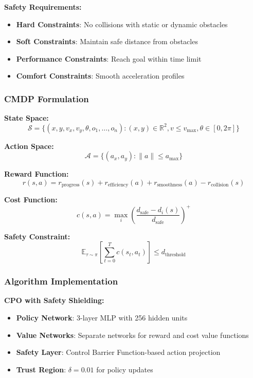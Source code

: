 \documentclass[12pt]{article}
\begin{document}
{{{{\textbf{Safety Requirements:}
\begin{itemize}
\item \textbf{Hard Constraints}: No collisions with static or dynamic obstacles
\item \textbf{Soft Constraints}: Maintain safe distance from obstacles
\item \textbf{Performance Constraints}: Reach goal within time limit
\item \textbf{Comfort Constraints}: Smooth acceleration profiles
\end{itemize}

\subsubsection{CMDP Formulation}

\textbf{State Space:}
\begin{equation}
\mathcal{S} = \{(x, y, v_x, v_y, \theta, o_1, \ldots, o_n) : (x, y) \in \mathbb{R}^2, v \leq v_{\max}, \theta \in [0, 2\pi]\}
\end{equation}

\textbf{Action Space:}
\begin{equation}
\mathcal{A} = \{(a_x, a_y) : \|a\| \leq a_{\max}\}
\end{equation}

\textbf{Reward Function:}
\begin{equation}
r(s, a) = r_{\text{progress}}(s) + r_{\text{efficiency}}(a) + r_{\text{smoothness}}(a) - r_{\text{collision}}(s)
\end{equation}

\textbf{Cost Function:}
\begin{equation}
c(s, a) = \max_i \left(\frac{d_{\text{safe}} - d_i(s)}{d_{\text{safe}}}\right)^+
\end{equation}

\textbf{Safety Constraint:}
\begin{equation}
\mathbb{E}_{\tau \sim \pi} \left[\sum_{t=0}^{T} c(s_t, a_t)\right] \leq d_{\text{threshold}}
\end{equation}

\subsubsection{Algorithm Implementation}

\textbf{CPO with Safety Shielding:}
\begin{itemize}
\item \textbf{Policy Network}: 3-layer MLP with 256 hidden units
\item \textbf{Value Networks}: Separate networks for reward and cost value functions
\item \textbf{Safety Layer}: Control Barrier Function-based action projection
\item \textbf{Trust Region}: $\delta = 0.01$ for policy updates
\end{itemize}

}}}}
\end{document}
